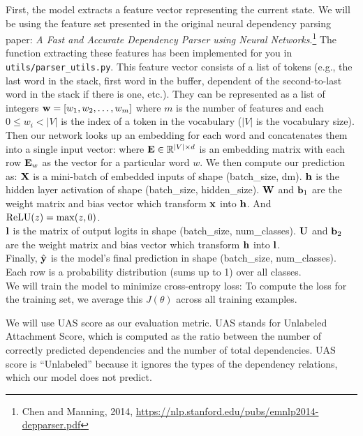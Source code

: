 \begin{parts}
    First, the model extracts a feature vector representing the current state. We will be using the feature set presented in the original neural dependency parsing paper: {\it A Fast and Accurate Dependency Parser using Neural Networks}.\footnote{Chen and Manning, 2014, \url{https://nlp.stanford.edu/pubs/emnlp2014-depparser.pdf}} The function extracting these features has been implemented for you in \texttt{utils/parser\_utils.py}. This feature vector consists of a list of tokens (e.g., the last word in the stack, first word in the buffer, dependent of the second-to-last word in the stack if there is one, etc.). They can be represented as a list of integers $\mathbf{w} = [w_1, w_2, \dots, w_m]$ where $m$ is the number of features and each $0 \leq w_i < |V|$ is the index of a token in the vocabulary ($|V|$ is the vocabulary size). Then our network looks up an embedding for each word and concatenates them into a single input vector:
    where $\mathbf{E} \in \mathbb{R}^{|V| \times d}$ is an embedding matrix with each row $\mathbf{E}_w$ as the vector for a particular word $w$. We then compute our prediction as:
    $\mathbf{X}$ is a mini-batch of embedded inputs of shape (batch\_size, dm). $\mathbf{h}$ is the hidden layer activation of shape (batch\_size, hidden\_size). $\mathbf{W}$ and $\mathbf{b}_1$ are the weight matrix and bias vector which transform $\mathbf{x}$ into $\mathbf{h}$. And $\operatorname{ReLU}(z) = \max(z, 0)$.\\
    $\mathbf{l}$ is the matrix of output logits in shape (batch\_size, num\_classes). $\mathbf{U}$ and $\mathbf{b}_2$ are the weight matrix and bias vector which transform $\mathbf{h}$ into $\mathbf{l}$.\\
    Finally, $\hat{\mathbf{y}}$ \space is the model's final prediction in shape (batch\_size, num\_classes). Each row is a probability distribution (sums up to 1) over all classes.\\
    We will train the model to minimize cross-entropy loss:
    \alns{
        J(\theta) &= CE(\by, \byt) = -\sum \limits_{i = 1}^{3} y_i \log \hat{y}_i
    }
    To compute the loss for the training set, we average this $J(\theta)$ across all training examples.

    We will use UAS score as our evaluation metric. UAS stands for Unlabeled Attachment Score, which is computed as the ratio between the number of correctly predicted dependencies and the number of total dependencies. UAS score is ``Unlabeled'' because it ignores the types of the dependency relations, which our model does not predict.\newline


\end{parts}
